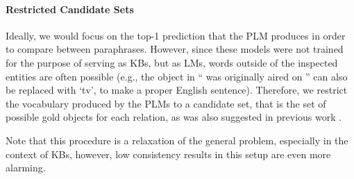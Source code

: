 \paragraph{Restricted Candidate Sets}
Ideally, we would focus on the top-1 prediction that the PLM produces in order to compare between paraphrases. However, since these models were not trained for the purpose of serving as KBs, but as LMs, words outside of the inspected entities are often possible (e.g., the object in ``\subj{} was originally aired on \obj{}'' can also be replaced with `tv', to make a proper English sentence).
Therefore, we restrict the vocabulary produced by the PLMs to a candidate set, that is the set of possible gold objects for each relation, as was also suggested in previous work \cite{Xiong2020Pretrained, nora@@}.

Note that this procedure is a relaxation of the general problem, especially in the context of KBs, however, low consistency results in this setup are even more alarming.
